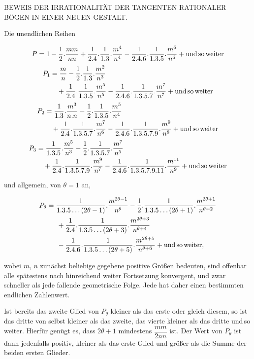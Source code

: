 \clearpage
{}

\begin{center}\large BEWEIS DER IRRATIONALITÄT DER TANGENTEN RATIONALER BÖGEN IN EINER NEUEN GESTALT.\end{center}

\noindent\hspace*{\parindent}Die unendlichen Reihen

\[
P = 1-\frac{1}{2} . \frac{mm}{nn}+\frac{1}{2.4} . \frac{1}{1.3} . \frac{m^4}{n^4}-\frac{1}{2.4.6} . \frac{1}{1.3.5} . \frac{m^6}{n^6}+\text{und\,so\,weiter}
\]
\[
\begin{aligned}
P_1 &= \frac{m}{n}-\frac{1}{2} . \frac{1}{1.3} . \frac{m^2}{n^3}\\ &\quad+\frac{1}{2.4} . \frac{1}{1.3.5} . \frac{m^5}{n^5}-\frac{1}{2.4.6} . \frac{1}{1.3.5.7} . \frac{m^7}{n^7}+\text{und\,so\,weiter}
\end{aligned}
\]
\[
\begin{aligned}
P_2 &= \frac{1}{1.3} . \frac{m^3}{n.n}-\frac{1}{2} . \frac{1}{1.3.5} . \frac{m^5}{n^4}\\ &\quad+\frac{1}{2.4} . \frac{1}{1.3.5.7} . \frac{m^7}{n^6}-\frac{1}{2.4.6} . \frac{1}{1.3.5.7.9} . \frac{m^9}{n^8}+\text{und\,so\,weiter}
\end{aligned}
\]
\[
\begin{aligned}
P_3 &= \frac{1}{1.3.5} . \frac{m^5}{n^3}-\frac{1}{2} . \frac{1}{1.3.5.7} . \frac{m^7}{n^5}\\ &\quad+\frac{1}{2.4} . \frac{1}{1.3.5.7.9} . \frac{m^9}{n^7}-\frac{1}{2.4.6} . \frac{1}{1.3.5.7.9.11} . \frac{m^{11}}{n^9}+\text{und\,so\,weiter}
\end{aligned}
\]

\noindent und allgemein, von $\theta = 1$ an,

\[
\begin{aligned}
P_\theta = {}& \frac{1}{1.3.5\ldots(2\theta-1)} . \frac{m^{2\theta-1}}{n^\theta}
-\frac{1}{2} . \frac{1}{1.3.5\ldots(2\theta+1)} . \frac{m^{2\theta+1}}{n^{\theta+2}}
\\ &\,+\frac{1}{2.4} . \frac{1}{1.3.5\ldots(2\theta+3)} . \frac{m^{2\theta+3}}{n^{\theta+4}}
\\ &\,-\frac{1}{2.4.6} . \frac{1}{1.3.5\ldots(2\theta+5)} . \frac{m^{2\theta+5}}{n^{\theta+6}}+\text{und\,so\,weiter},
\end{aligned}
\]

\noindent wobei $m$, $n$ zunächst beliebige gegebene positive Größen bedeuten,
sind offenbar alle spätestens nach hinreichend weiter Fortsetzung
konvergent, und zwar schneller als jede fallende geometrische Folge.
Jede hat daher einen bestimmten endlichen Zahlenwert.

Ist bereits das zweite Glied von $P_\theta$ kleiner als das erste oder
gleich diesem, so ist das dritte von selbst kleiner als das zweite, das
vierte kleiner als das dritte und\,so\,weiter. Hierfür genügt es,
dass $2\theta+1$ mindestens $\dfrac{mm}{2nn}$ ist. Der
Wert von $P_\theta$ ist dann jedenfalls positiv, kleiner als das erste Glied und
größer als die Summe der beiden ersten Glieder.

